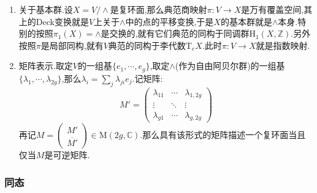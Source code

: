 \begin{enumerate}
\begin{proof}
		取$X$的李代数$\mathrm{Lie}(X)=\mathrm{T}_eX$,我们有指数映射$\exp:\mathrm{Lie}(X)\to X$,按照$X$是阿贝尔的,这个映射是李群之间的态射.它是局部同胚,于是$\mathrm{Im}\exp$包含了$1_X$的某个开子群(因为比方说设$\mathrm{Im}\exp$包含了$1_X$的对称开邻域$V$,那么$\cup_{n\ge1}V^n$是开子群,并且包含在$\mathrm{Im}\exp$里),拓扑群的开子群也是闭的,连通性就保证$\mathrm{Im}\exp=X$.这里$X$是紧的导致$\ker\exp$必然是一个格.
	\end{proof}
	\item 关于基本群.设$X=V/\wedge$是复环面,那么典范商映射$\pi:V\to X$是万有覆盖空间,其上的Deck变换就是$V$上关于$\wedge$中的点的平移变换,于是$X$的基本群就是$\wedge$本身.特别的按照$\pi_1(X)=\wedge$是交换的,就有它们典范的同构于同调群$\mathrm{H}_1(X,\mathbb{Z})$.另外按照$\pi$是局部同构,就有$V$典范的同构于李代数$\mathrm{T}_eX$.此时$\pi:V\to X$就是指数映射.
	\item 矩阵表示.取定$V$的一组基$\{e_1,\cdots,e_g\}$,取定$\wedge$(作为自由阿贝尔群)的一组基$\{\lambda_1,\cdots,\lambda_{2g}\}$,那么$\lambda_i=\sum_j\lambda_{ji}e_j$.记矩阵:
	$$M'=\left(\begin{array}{ccc}\lambda_{11}&\cdots&\lambda_{1,2g}\\\vdots&\ddots&\vdots\\\lambda_{g1}&\cdots&\lambda_{g,2g}\end{array}\right)$$
	再记$M=\left(\begin{array}{c}M'\\\overline{M'}\end{array}\right)\in\mathrm{M}(2g,\mathbb{C})$.那么具有该形式的矩阵描述一个复环面当且仅当$M$是可逆矩阵.
\end{enumerate}
\subsubsection{同态}

